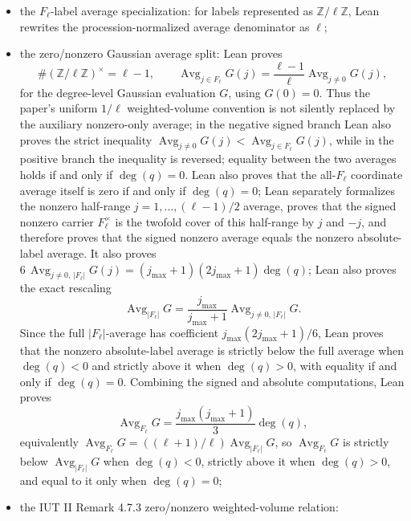 \documentclass[11pt]{article}
\begin{document}
\begin{itemize}
  log-volume given by the finite sum over the container, normalized denominator
  \(j+1\), and invariance under container permutations;
\item the \(F_\ell\)-label average specialization:
  for labels represented as \(\mathbb{Z}/\ell\mathbb{Z}\), Lean rewrites the
  procession-normalized average denominator as \(\ell\);
\item the zero/nonzero Gaussian average split:
  Lean proves
  \[
  \#(\mathbb{Z}/\ell\mathbb{Z})^\times=\ell-1,\qquad
  \operatorname{Avg}_{j\in F_\ell}G(j)
  =\frac{\ell-1}{\ell}\operatorname{Avg}_{j\ne0}G(j),
  \]
  for the degree-level Gaussian evaluation \(G\), using \(G(0)=0\).  Thus the
  paper's uniform \(1/\ell\) weighted-volume convention is not silently replaced
  by the auxiliary nonzero-only average; in the negative signed branch Lean also
  proves the strict inequality
  \(\operatorname{Avg}_{j\ne0}G(j)<\operatorname{Avg}_{j\in F_\ell}G(j)\),
  while in the positive branch the inequality is reversed; equality between the
  two averages holds if and only if \(\deg(q)=0\).  Lean also proves that the
  all-\(F_\ell\) coordinate average itself is zero if and only if
  \(\deg(q)=0\);
  Lean separately formalizes the nonzero half-range
  \(j=1,\ldots,(\ell-1)/2\) average, proves that the signed nonzero carrier
  \(F_\ell^\times\) is the twofold cover of this half-range by \(j\) and \(-j\),
  and therefore proves that the signed nonzero average equals the nonzero
  absolute-label average.  It also proves
  \(6\,\operatorname{Avg}_{j\ne0,\,|F_\ell|}G(j)
   =(j_{\max}+1)(2j_{\max}+1)\deg(q)\); Lean also proves the exact rescaling
  \[
    \operatorname{Avg}_{|F_\ell|}G
    =\frac{j_{\max}}{j_{\max}+1}\operatorname{Avg}_{j\ne0,\,|F_\ell|}G.
  \]
  Since the full \(|F_\ell|\)-average
  has coefficient \(j_{\max}(2j_{\max}+1)/6\), Lean proves that the nonzero
  absolute-label average is strictly below the full average when \(\deg(q)<0\)
  and strictly above it when \(\deg(q)>0\), with equality if and only if
  \(\deg(q)=0\).  Combining the signed and absolute computations, Lean proves
  \[
  \operatorname{Avg}_{F_\ell}G
  =\frac{j_{\max}(j_{\max}+1)}{3}\deg(q),
  \]
  equivalently
  \(\operatorname{Avg}_{F_\ell}G=((\ell+1)/\ell)
  \operatorname{Avg}_{|F_\ell|}G\),
  so \(\operatorname{Avg}_{F_\ell}G\) is strictly below
  \(\operatorname{Avg}_{|F_\ell|}G\) when \(\deg(q)<0\), strictly above it when
  \(\deg(q)>0\), and equal to it only when \(\deg(q)=0\);
\item the IUT II Remark 4.7.3 zero/nonzero weighted-volume relation:

\end{itemize}
\end{document}
